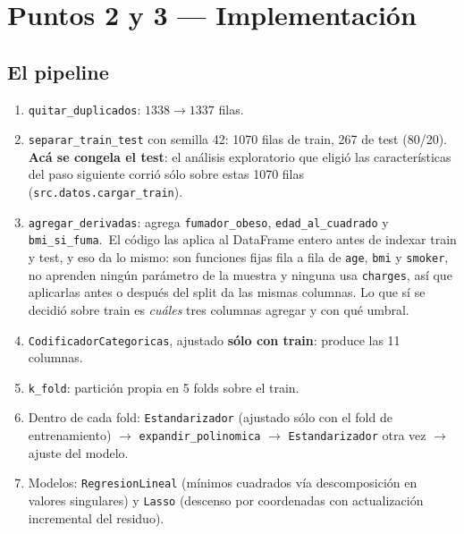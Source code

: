 \documentclass[11pt,a4paper]{article}
\begin{document}
\section{Puntos 2 y 3 --- Implementación}

\subsection{El pipeline}

\begin{sloppypar}
\begin{enumerate}
  \item \texttt{quitar\_duplicados}: $1338 \rightarrow 1337$ filas.
  \item \texttt{separar\_train\_test} con semilla 42: 1070 filas de train, 267 de test (80/20).
        \textbf{Acá se congela el test}: el análisis exploratorio que eligió las
        características del paso siguiente corrió sólo sobre estas 1070 filas
        (\texttt{src.datos.cargar\_train}).
  \item \texttt{agregar\_derivadas}: agrega \texttt{fumador\_obeso},
        \texttt{edad\_al\_cuadrado} y \texttt{bmi\_si\_fuma}.\ El código las aplica al
        DataFrame entero antes de indexar train y test, y eso da lo mismo: son funciones fijas
        fila a fila de \texttt{age}, \texttt{bmi} y \texttt{smoker}, no aprenden ningún
        parámetro de la muestra y ninguna usa \texttt{charges}, así que aplicarlas antes o
        después del split da las mismas columnas. Lo que sí se decidió sobre train es
        \emph{cuáles} tres columnas agregar y con qué umbral.
  \item \texttt{CodificadorCategoricas}, ajustado \textbf{sólo con train}: produce las 11
        columnas.
  \item \texttt{k\_fold}: partición propia en 5 folds sobre el train.
  \item Dentro de cada fold: \texttt{Estandarizador} (ajustado sólo con el fold de
        entrenamiento) $\rightarrow$ \texttt{expandir\_polinomica} $\rightarrow$
        \texttt{Estandarizador} otra vez $\rightarrow$ ajuste del modelo.
  \item Modelos: \texttt{RegresionLineal} (mínimos cuadrados vía descomposición en valores
        singulares) y \texttt{Lasso} (descenso por coordenadas con actualización incremental
        del residuo).
\end{enumerate}
\end{sloppypar}
\end{document}
